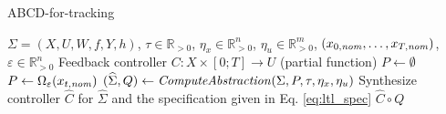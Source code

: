 \begin{algorithm}
	\caption{ABCD-for-tracking}
	\label{alg:abcd-with-time-for-tracking}
	\begin{algorithmic}[1]
		\Require $\Sigma=(X,U,W,f,Y,h)$, $\tau \in \mathbb{R}_{>0}$, $\eta_x\in \mathbb{R}^n_{>0}$, $\eta_u\in \mathbb{R}^m_{>0}$, $(x_{0,\mathit{nom}},\ldots,x_{T,\mathit{nom}})$, $\varepsilon \in \mathbb{R}_{>0}^{n}$
		\Ensure Feedback controller $C\colon X\times [0;T]\to U$ (partial function)
		\State $P \gets \emptyset$
		\State $P \gets \Omega_{\varepsilon}(x_{t,\mathit{nom}})$
		\EndFor
		\State $(\widehat{\Sigma},Q) \gets \mathit{ComputeAbstraction}(\Sigma, P, \tau, \eta_{x} , \eta_u)$
		\State Synthesize controller $\widehat{C}$ for $\widehat{\Sigma}$ and the specification given in Eq. \eqref{eq:ltl_spec} %
		\State \Return $\widehat{C}\circ Q$
	\end{algorithmic}
\end{algorithm}





